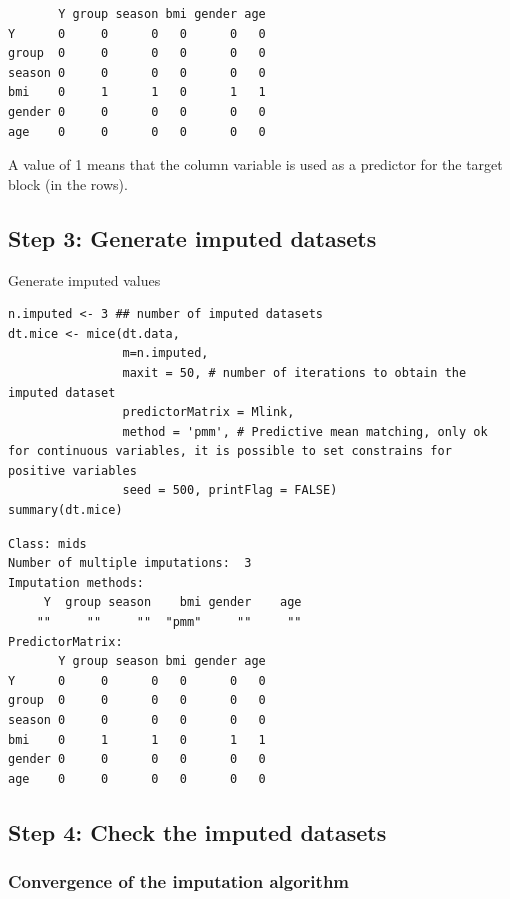\documentclass[12pt]{article}
\begin{document}
\begin{verbatim}
       Y group season bmi gender age
Y      0     0      0   0      0   0
group  0     0      0   0      0   0
season 0     0      0   0      0   0
bmi    0     1      1   0      1   1
gender 0     0      0   0      0   0
age    0     0      0   0      0   0
\end{verbatim}

A value of 1 means that the column variable is used as a predictor for
 the target block (in the rows).

\clearpage

\subsection{Step 3: Generate imputed datasets}
\label{sec:org0287794}
Generate imputed values
\lstset{language=r,label= ,caption= ,captionpos=b,numbers=none}
\begin{lstlisting}
n.imputed <- 3 ## number of imputed datasets
dt.mice <- mice(dt.data,
				m=n.imputed, 
				maxit = 50, # number of iterations to obtain the imputed dataset
				predictorMatrix = Mlink,
				method = 'pmm', # Predictive mean matching, only ok for continuous variables, it is possible to set constrains for positive variables
				seed = 500, printFlag = FALSE)
summary(dt.mice)
\end{lstlisting}

\begin{verbatim}
Class: mids
Number of multiple imputations:  3 
Imputation methods:
     Y  group season    bmi gender    age 
    ""     ""     ""  "pmm"     ""     "" 
PredictorMatrix:
       Y group season bmi gender age
Y      0     0      0   0      0   0
group  0     0      0   0      0   0
season 0     0      0   0      0   0
bmi    0     1      1   0      1   1
gender 0     0      0   0      0   0
age    0     0      0   0      0   0
\end{verbatim}

\clearpage

\subsection{Step 4: Check the imputed datasets}
\label{sec:org3513128}
\subsubsection{Convergence of the imputation algorithm}
\label{sec:orga0ec3c8}
\end{document}
